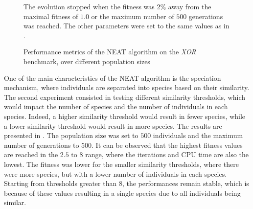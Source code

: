 \begin{figure}
\begin{center}
    \end{center}
    \caption{Performance metrics of the NEAT algorithm on the \textit{XOR} benchmark, over different population sizes}
    {The evolution stopped when the fitness was $2\%$ away from the maximal fitness of $1.0$ or the maximum number of $500$ generations was reached.
    The other parameters were set to the same values as in \cite{neat}.}
    \label{fig:neat_xor}
\end{figure}

One of the main characteristics of the NEAT algorithm is the speciation mechanism, where individuals are separated into species based on their similarity. The second experiment consisted in testing different
similarity thresholds, which would impact the number of species and the number of individuals in each species. Indeed, a higher similarity threshold would result in fewer species, while a lower similarity threshold
would result in more species. The results are presented in . The population size was set to $500$ individuals and the maximum number of generations to $500$. It can be observed that
the highest fitness values are reached in the $2.5$ to $8$ range, where the iterations and CPU time are also the lowest. The fitness was lower for the smaller similarity thresholds, where there were more
species, but with a lower number of individuals in each species. Starting from thresholds greater than $8$, the performances remain stable, which is because of these values resulting in a single species due to
all individuals being similar.

